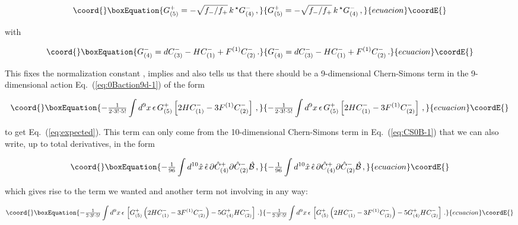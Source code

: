 \documentclass[12pt,a4paper]{article}
\begin{document}
\begin{equation}\coord{}\boxEquation{
\label{eq:expected}
G^{+}_{(5)}=  -\sqrt{f_{-}/f_{+}}\, k\, {}^{\star}G^{-}_{(4)}\, ,
}{
G^{+}_{(5)}=  -\sqrt{f_{-}/f_{+}}\, k\, {}^{\star}G^{-}_{(4)}\, ,
}{ecuacion}\coordE{}\end{equation}

\noindent with 

\begin{equation}\coord{}\boxEquation{
G^{-}_{(4)} = dC^{-}_{(3)} -HC^{-}_{(1)} +F^{(1)} C^{-}_{(2)}\, .
}{
G^{-}_{(4)} = dC^{-}_{(3)} -HC^{-}_{(1)} +F^{(1)} C^{-}_{(2)}\, .
}{ecuacion}\coordE{}\end{equation}

\noindent This fixes the normalization constant 
\coordHE{}, implies \coordHE{} and
also tells us that there should be a 9-dimensional Chern-Simons term
in the 9-dimensional action Eq.~(\ref{eq:0Baction9d-1}) of the form

\begin{equation}\coord{}\boxEquation{
-{\textstyle\frac{1}{2\cdot 3!\cdot5!}}\int d^{9}x\, \epsilon\, G^{+}_{(5)}
\left[2HC^{-}_{(1)}-3F^{(1)}C^{-}_{(2)}\right]\, ,
}{
-{\textstyle\frac{1}{2\cdot 3!\cdot5!}}\int d^{9}x\, \epsilon\, G^{+}_{(5)}
\left[2HC^{-}_{(1)}-3F^{(1)}C^{-}_{(2)}\right]\, ,
}{ecuacion}\coordE{}\end{equation}

\noindent to get Eq.~(\ref{eq:expected}). This term can only come
from the 10-dimensional Chern-Simons term in
Eq.~(\ref{eq:CS0B-1}) that we can also write, up to total derivatives,
in the form

\begin{equation}\coord{}\boxEquation{
\label{eq:CS0B-2}
-{\textstyle\frac{1}{96}} \int d^{10}\hat{x}\, 
\hat{\epsilon}\,
\partial\hat{C}^{+}_{(4)}\partial\hat{C}^{-}_{(2)}\hat{\cal B}\, ,
}{
-{\textstyle\frac{1}{96}} \int d^{10}\hat{x}\, 
\hat{\epsilon}\,
\partial\hat{C}^{+}_{(4)}\partial\hat{C}^{-}_{(2)}\hat{\cal B}\, ,
}{ecuacion}\coordE{}\end{equation}

\noindent which gives rise to the term we wanted and another term 
not involving \coordHE{} in any way:

\begin{equation}\coord{}\boxEquation{
-{\textstyle\frac{1}{2\cdot 3!\cdot 5!}} \int d^{9}x\,
\epsilon\,
\left[G^{+}_{(5)}\left(2HC^{-}_{(1)} -3F^{(1)}C^{-}_{(2)}\right) 
-5G^{+}_{(4)}HC^{-}_{(2)}
\right]\, .
}{
-{\textstyle\frac{1}{2\cdot 3!\cdot 5!}} \int d^{9}x\,
\epsilon\,
\left[G^{+}_{(5)}\left(2HC^{-}_{(1)} -3F^{(1)}C^{-}_{(2)}\right) 
-5G^{+}_{(4)}HC^{-}_{(2)}
\right]\, .
}{ecuacion}\coordE{}\end{equation}
\end{document}
